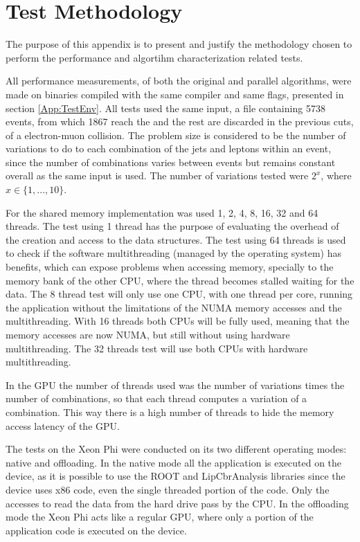 \appendix
{}
\chapter{Test Methodology}
\label{App:TestMethodology}

The purpose of this appendix is to present and justify the methodology chosen to perform the performance and algortihm characterization related tests.

All performance measurements, of both the original and parallel algorithms, were made on binaries compiled with the same compiler and same flags, presented in section \ref{App:TestEnv}. All tests used the same input, a file containing 5738 events, from which 1867 reach the \ttDilepKinFit and the rest are discarded in the previous cuts, of a electron-muon collision. The problem size is considered to be the number of variations to do to each combination of the jets and leptons within an event, since the number of combinations varies between events but remains constant overall as the same input is used. The number of variations tested were $2^{x}$, where $x \in \{1, ..., 10\}$.

For the shared memory implementation was used 1, 2, 4, 8, 16, 32 and 64 threads. The test using 1 thread has the purpose of evaluating the overhead of the creation and access to the data structures. The test using 64 threads is used to check if the software multithreading (managed by the operating system) has benefits, which can expose problems when accessing memory, specially to the memory bank of the other CPU, where the thread becomes stalled waiting for the data. The 8 thread test will only use one CPU, with one thread per core, running the application without the limitations of the NUMA memory accesses and the multithreading. With 16 threads both CPUs will be fully used, meaning that the memory accesses are now NUMA, but still without using hardware multithreading. The 32 threads test will use both CPUs with hardware multithreading.

In the GPU the number of threads used was the number of variations times the number of combinations, so that each thread computes a variation of a combination. This way there is a high number of threads to hide the memory access latency of the GPU.

The tests on the \intel Xeon Phi were conducted on its two different operating modes: native and offloading. In the native mode all the application is executed on the device, as it is possible to use the ROOT and LipCbrAnalysis libraries since the device uses x86 code, even the single threaded portion of the code. Only the accesses to read the data from the hard drive pass by the CPU. In the offloading mode the Xeon Phi acts like a regular GPU, where only a portion of the application code is executed on the device.

